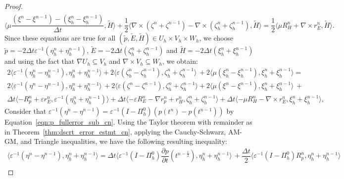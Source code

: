 \documentclass{amsart}
\theoremstyle{thmstyleone}%
\theoremstyle{thmstyletwo}%
\theoremstyle{thmstylethree}%
\newcommand{\ainnerproduct}[2]{\langle #1, #2 \rangle}
\newcommand{\aInnerproduct}[2]{\bigl\langle #1, #2 \bigr\rangle}
\begin{document}
\begin{proof}
\begin{multline*}
\end{multline*}
\vspace{-1em}
\[
  \aInnerproduct{\mu \dfrac{\left(\xi^n - \xi^{n - 1} \right) - \left(\xi^n_h - \xi^{n - 1}_h \right)}{\Delta t}}{\widetilde{H}} + \dfrac{1}{2} \aInnerproduct{\nabla \times \left(\zeta^n + \zeta^{n - 1} \right) - \nabla \times \left(\zeta^n_h + \zeta^{n - 1}_h \right)}{\widetilde{H}} = \dfrac{1}{2} \aInnerproduct{\mu R_H^n + \nabla \times r_E^n}{\widetilde{H}}.
\]
Since these equations are true for all $(\widetilde{p}, \widetilde{E}, \widetilde{H}) \in U_h \times V_h \times W_h$, we choose $\widetilde{p} = -2 \Delta t \varepsilon^{-1} \left( \eta_h^n + \eta_h^{n - 1}\right)$, $\widetilde{E} = -2 \Delta t \left( \zeta_h^n + \zeta_h^{n - 1} \right)$ and $\widetilde{H} = -2 \Delta t \left( \xi_h^n + \xi_h^{n - 1} \right)$ and using the fact that $\nabla U_h \subseteq V_h$ and $\nabla \times V_h \subseteq W_h$, we obtain:
\begin{multline}
2 \ainnerproduct{\varepsilon^{-1} \left( \eta^n_h - \eta^{n - 1}_h \right)}{\eta^n_h + \eta^{n - 1}_h} + 2 \ainnerproduct{\varepsilon \left( \zeta^n_h - \zeta^{n - 1}_h \right)}{\zeta^n_h + \zeta^{n - 1}_h} \, + 2 \ainnerproduct{\mu \left( \xi^n_h - \xi^{n - 1}_h \right)}{\xi^n_h + \xi^{n - 1}_h} = \\
2 \ainnerproduct{\varepsilon^{-1} \left( \eta^n - \eta^{n - 1} \right)}{\eta^n_h + \eta^{n - 1}_h} \, + 2 \ainnerproduct{\varepsilon \left( \zeta^n - \zeta^{n - 1} \right)}{\zeta^n_h + \zeta^{n - 1}_h} + 2 \ainnerproduct{\mu \left( \xi^n - \xi^{n - 1} \right)}{\xi^n_h + \xi^{n - 1}_h} \, + \\
\Delta t \ainnerproduct{- R_p^n + \varepsilon r_E^n}{\varepsilon^{-1} \left( \eta^n_h + \eta^{n - 1}_h \right)} + \Delta t \ainnerproduct{-\varepsilon R_E^n - \nabla r_p^n + r_H^n}{\zeta^n_h + \zeta^{n - 1}_h} + \Delta t \ainnerproduct{-\mu R_H^n - \nabla \times r_E^n}{\xi^n_h + \xi^{n - 1}_h}, \label{eqn:suberror_p+E+H_cn}
\end{multline}
Consider that  $\varepsilon^{-1} \left(\eta^n - \eta^{n-1}\right) = \varepsilon^{-1} \left(I - \Pi_h^0\right) \left( p(t^n) - p(t^{n-1})\right)$ by Equation~\eqref{eqn:p_fullerror_sub_cn}. Using the Taylor theorem with remainder as in Theorem~\ref{thm:dscrt_error_estmt_cn}, applying the Cauchy-Schwarz, AM-GM, and Triangle inequalities, we have the following resulting inequality:
\begin{multline*}
  \ainnerproduct{\varepsilon^{-1} \left( \eta^n - \eta^{n - 1} \right)}{\eta^n_h + \eta^{n - 1}_h} = \Delta t \ainnerproduct{\varepsilon^{-1} \left( I - \Pi_h^0 \right) \dfrac{\partial p}{\partial t} (t^{n - \frac{1}{2}}) }{\eta^n_h + \eta^{n - 1}_h} \, + \dfrac{\Delta t}{2} \ainnerproduct{\varepsilon^{-1} \left( I - \Pi_h^0 \right) R_p^n}{\eta^n_h + \eta^{n - 1}_h} \\ 

\end{multline*}
\end{proof}
\end{document}
